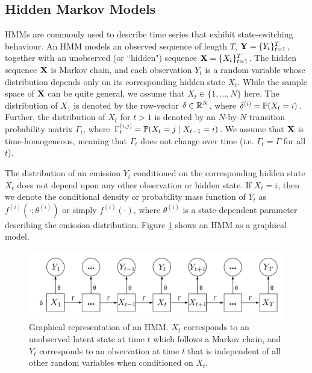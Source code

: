 \subsection{Hidden Markov Models}

HMMs are commonly used to describe time series that exhibit state-switching behaviour. An HMM models an observed sequence of length $T$, $\mathbf{Y} = \{Y_t\}_{t=1}^T$, together with an unobserved (or  ``hidden") sequence $\mathbf{X} = \{X_t\}_{t=1}^T$. The hidden sequence $\mathbf{X}$ is Markov chain, and each observation $Y_t$ is a random variable whose distribution depends only on its corresponding hidden state $X_t$. While the sample space of $\mathbf{X}$ can be quite general, we assume that $X_t \in \{1,\ldots,N\}$ here. The distribution of $X_1$ is denoted by the row-vector $\delta \in \mathbb{R}^N$, where $\delta^{(i)} = \mathbb{P}(X_t = i)$. Further, the distribution of $X_t$ for $t > 1$ is denoted by an $N$-by-$N$ transition probability matrix $\Gamma_t$, where $\Gamma_t^{(i,j)} = \mathbb{P}(X_t = j \mid X_{t-1} = i)$. We assume that $\mathbf{X}$ is time-homogeneous, meaning that $\Gamma_t$ does not change over time (i.e. $\Gamma_t = \Gamma$ for all $t$). 

The distribution of an emission $Y_t$ conditioned on the corresponding hidden state $X_t$ does not depend upon any other observation or hidden state. If $X_t=i$, then we denote the conditional density or probability mass function of $Y_t$ as $f^{(i)}(\cdot ; \theta^{(i)})$ or simply $f^{(i)}(\cdot)$, where $\theta^{(i)}$ is a state-dependent parameter describing the emission distribution. Figure \ref{fig:HMM} shows an HMM as a graphical model.

\begin{figure}[h]
    \centering
    \includegraphics[width=5in]{../plt/HMM.png}
    \caption{Graphical representation of an HMM. $X_t$ corresponds to an unobserved latent state at time $t$ which follows a Markov chain, and $Y_t$ corresponds to an observation at time $t$ that is independent of all other random variables when conditioned on $X_t$.}
    \label{fig:HMM}
\end{figure}

